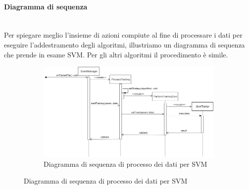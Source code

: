 		\paragraph*{Diagramma di sequenza} \mbox{} \\[1mm]
		Per spiegare meglio l'insieme di azioni compiute al fine di processare i dati per eseguire l'addestramento degli algoritmi, illustriamo un diagramma di sequenza che prende in esame SVM\glo. Per gli altri algoritmi il procedimento è simile.
		\mbox{}
		\begin{landscape}
			\begin{figure}
				\begin{figure} [H]
					\includegraphics[width=\linewidth]{img/Diagrammi/ds-app.png}
					\caption{Diagramma di sequenza di processo dei dati per SVM}
				\end{figure}
			\end{figure}
		\end{landscape}
